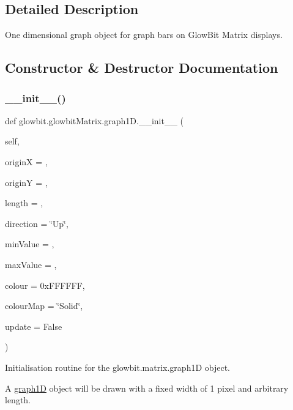 \subsection{Detailed Description}
One dimensional graph object for graph bars on Glow\+Bit Matrix displays. 



\subsection{Constructor \& Destructor Documentation}
\mbox{\label{classglowbit_1_1glowbitMatrix_1_1graph1D_aafb789a57fe97ce1625bfb486400b2a1}} 
\subsubsection{\texorpdfstring{\+\_\+\+\_\+init\+\_\+\+\_\+()}{\_\_init\_\_()}}
{\footnotesize\ttfamily def glowbit.\+glowbit\+Matrix.\+graph1\+D.\+\_\+\+\_\+init\+\_\+\+\_\+ (\begin{DoxyParamCaption}\item[{}]{self,  }\item[{}]{originX = {},  }\item[{}]{originY = {},  }\item[{}]{length = {},  }\item[{}]{direction = {\ttfamily \char`\"{}Up\char`\"{}},  }\item[{}]{min\+Value = {},  }\item[{}]{max\+Value = {},  }\item[{}]{colour = {\ttfamily 0xFFFFFF},  }\item[{}]{colour\+Map = {\ttfamily \char`\"{}Solid\char`\"{}},  }\item[{}]{update = {\ttfamily False} }\end{DoxyParamCaption})}



Initialisation routine for the glowbit.\+matrix.\+graph1D object. 

A \hyperlink{classglowbit_1_1glowbitMatrix_1_1graph1D}{graph1D} object will be drawn with a fixed width of 1 pixel and arbitrary length.



